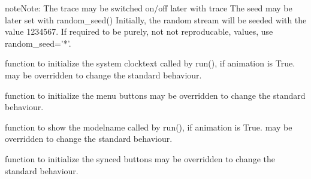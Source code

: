 \documentclass[letterpaper,10pt,english]{sphinxmanual}
\begin{document}
\begin{fulllineitems}
\begin{quote}
\begin{description}
\end{description}\end{quote}

\begin{sphinxadmonition}{note}{Note:}
The trace may be switched on/off later with trace 
The seed may be later set with random\_seed() 
Initially, the random stream will be seeded with the value 1234567.
If required to be purely, not not reproducable, values, use
random\_seed=’*’.
\end{sphinxadmonition}

\begin{fulllineitems}
\label{\detokenize{Reference:salabim.Environment.an_clocktext}}
function to initialize the system clocktext 
called by run(), if animation is True. 
may be overridden to change the standard behaviour.

\end{fulllineitems}


\begin{fulllineitems}
\label{\detokenize{Reference:salabim.Environment.an_menu_buttons}}
function to initialize the menu buttons 
may be overridden to change the standard behaviour.

\end{fulllineitems}


\begin{fulllineitems}
\label{\detokenize{Reference:salabim.Environment.an_modelname}}
function to show the modelname 
called by run(), if animation is True. 
may be overridden to change the standard behaviour.

\end{fulllineitems}


\begin{fulllineitems}
\label{\detokenize{Reference:salabim.Environment.an_synced_buttons}}
function to initialize the synced buttons 
may be overridden to change the standard behaviour.


\end{fulllineitems}
\end{fulllineitems}
\end{document}
